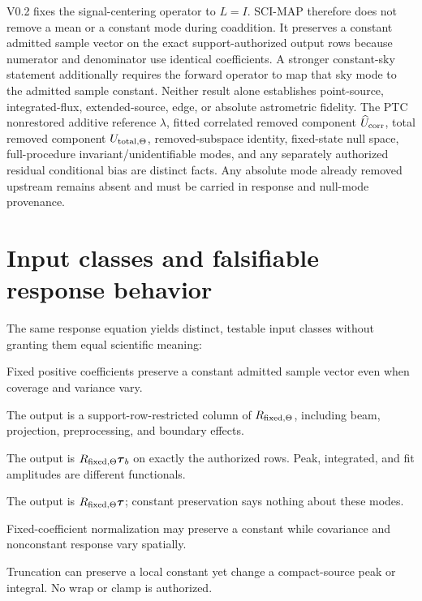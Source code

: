 \documentclass[10pt]{article}
\begin{document}
V0.2 fixes the signal-centering operator to \(L=I\). SCI-MAP therefore does not
remove a mean or a constant mode during coaddition. It preserves a constant
admitted sample vector on the exact support-authorized output rows because
numerator and denominator use identical coefficients. A stronger constant-sky
statement additionally requires the forward operator to map that sky mode to
the admitted sample constant. Neither result alone establishes point-source,
integrated-flux, extended-source, edge, or absolute astrometric fidelity. The
PTC nonrestored additive reference \(\lambda\), fitted correlated removed
component \(\widehat U_{\rm corr}\), total removed component
\(U_{{\rm total},\Theta}\), removed-subspace identity, fixed-state null space,
full-procedure invariant/unidentifiable modes, and any separately authorized
residual conditional bias are distinct facts. Any absolute mode already
removed upstream remains absent and must be carried in response and null-mode
provenance.

\clearpage
\section{Input classes and falsifiable response behavior}

The same response equation yields distinct, testable input classes without
granting them equal scientific meaning:

\begin{description}[style=nextline,leftmargin=1.8em]
\item[Constant.] Fixed positive coefficients preserve a constant admitted
sample vector even when coverage and variance vary.
\item[Delta or basis pixel.] The output is a support-row-restricted column of
\(R_{{\rm fixed},\Theta}\), including beam, projection, preprocessing, and boundary
effects.
\item[Point-source template.] The output is
\(R_{{\rm fixed},\Theta}\boldsymbol\tau_b\) on exactly the authorized rows. Peak,
integrated, and fit amplitudes are different functionals.
\item[Resolved, gradient, and Fourier structure.] The output is
\(R_{{\rm fixed},\Theta}\boldsymbol\tau\); constant preservation says nothing about these
modes.
\item[Variable coverage.] Fixed-coefficient normalization may preserve a
constant while covariance and nonconstant response vary spatially.
\item[Finite boundary.] Truncation can preserve a local constant yet change a
compact-source peak or integral. No wrap or clamp is authorized.
\end{description}
\end{document}
